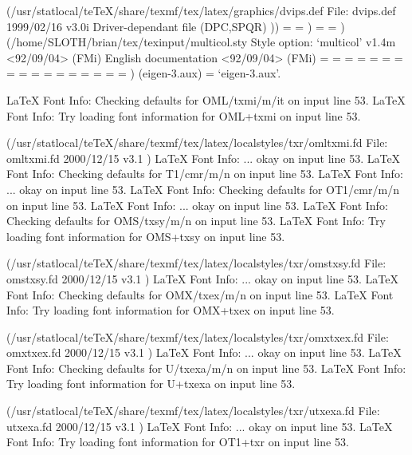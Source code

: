(/usr/statlocal/teTeX/share/texmf/tex/latex/graphics/dvips.def
File: dvips.def 1999/02/16 v3.0i Driver-dependant file (DPC,SPQR)
))
\Gin@req@height=
\Gin@req@width=
)
\epsfxsize=
\epsfysize=
)
(/home/SLOTH/brian/tex/texinput/multicol.sty
Style option: `multicol' v1.4m <92/09/04> (FMi)
English documentation          <92/09/04> (FMi)
\mult@box=
\multicol@leftmargin=
\c@unbalance=
\c@collectmore=
\c@tracingmulticols=
\col@number=
\doublecol@number=
\multicoltolerance=
\multicolpretolerance=
\full@width=
\page@free=
\premulticols=
\postmulticols=
\multicolsep=
\multicolbaselineskip=
\partial@page=
\last@line=
) (eigen-3.aux)
 = `eigen-3.aux'.

LaTeX Font Info:    Checking defaults for OML/txmi/m/it on input line 53.
LaTeX Font Info:    Try loading font information for OML+txmi on input line 53.


(/usr/statlocal/teTeX/share/texmf/tex/latex/localstyles/txr/omltxmi.fd
File: omltxmi.fd 2000/12/15 v3.1
)
LaTeX Font Info:    ... okay on input line 53.
LaTeX Font Info:    Checking defaults for T1/cmr/m/n on input line 53.
LaTeX Font Info:    ... okay on input line 53.
LaTeX Font Info:    Checking defaults for OT1/cmr/m/n on input line 53.
LaTeX Font Info:    ... okay on input line 53.
LaTeX Font Info:    Checking defaults for OMS/txsy/m/n on input line 53.
LaTeX Font Info:    Try loading font information for OMS+txsy on input line 53.


(/usr/statlocal/teTeX/share/texmf/tex/latex/localstyles/txr/omstxsy.fd
File: omstxsy.fd 2000/12/15 v3.1
)
LaTeX Font Info:    ... okay on input line 53.
LaTeX Font Info:    Checking defaults for OMX/txex/m/n on input line 53.
LaTeX Font Info:    Try loading font information for OMX+txex on input line 53.


(/usr/statlocal/teTeX/share/texmf/tex/latex/localstyles/txr/omxtxex.fd
File: omxtxex.fd 2000/12/15 v3.1
)
LaTeX Font Info:    ... okay on input line 53.
LaTeX Font Info:    Checking defaults for U/txexa/m/n on input line 53.
LaTeX Font Info:    Try loading font information for U+txexa on input line 53.

(/usr/statlocal/teTeX/share/texmf/tex/latex/localstyles/txr/utxexa.fd
File: utxexa.fd 2000/12/15 v3.1
)
LaTeX Font Info:    ... okay on input line 53.
LaTeX Font Info:    Try loading font information for OT1+txr on input line 53.

